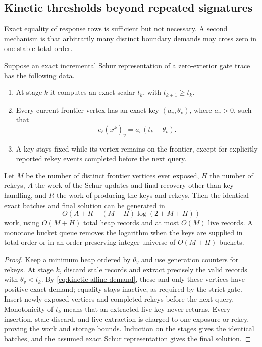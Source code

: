 \subsection{Kinetic thresholds beyond repeated signatures}
\label{sec:kinetic-thresholds}

Exact equality of response rows is sufficient but not necessary.  A second
mechanism is that arbitrarily many distinct boundary demands may cross zero
in one stable total order.

\begin{theorem}
\label{thm:kinetic-scalar-gate}
Suppose an exact incremental Schur representation of a zero-exterior gate
trace has the following data.
\begin{enumerate}[label=(\roman*),leftmargin=*]
 \item At stage $k$ it computes an exact scalar $t_k$, with
 $t_{k+1}\geq t_k$.
 \item Every current frontier vertex has an exact key
 $(a_v,\theta_v)$, where $a_v>0$, such that
 \begin{equation}
  e_\ell(x^k)_v=a_v(t_k-\theta_v).
  \label{eq:kinetic-affine-demand}
 \end{equation}
 \item A key stays fixed while its vertex remains on the frontier, except
 for explicitly reported rekey events completed before the next query.
\end{enumerate}
Let $M$ be the number of distinct frontier vertices ever exposed, $H$ the
number of rekeys, $A$ the work of the Schur updates and final recovery other
than key handling, and $R$ the work of producing the keys and rekeys.  Then
the identical exact batches and final solution can be generated in
\begin{equation}
 O\!\left(A+R+(M+H)\log(2+M+H)\right)
 \label{eq:kinetic-gate-work}
\end{equation}
work, using $O(M+H)$ total heap records and at most $O(M)$ live records.  A
monotone bucket queue removes the
logarithm when the keys are supplied in total order or in an order-preserving
integer universe of $O(M+H)$ buckets.
\end{theorem}

\begin{proof}
Keep a minimum heap ordered by $\theta_v$ and use generation counters for
rekeys.  At stage $k$, discard stale records and extract precisely the valid
records with $\theta_v<t_k$.  By \cref{eq:kinetic-affine-demand}, these and
only these vertices have positive exact demand; equality stays inactive, as
required by the strict gate.  Insert newly exposed vertices and completed
rekeys before the next query.  Monotonicity of $t_k$ means that an extracted
live key never returns.  Every insertion, stale discard, and live extraction
is charged to one exposure or rekey, proving the work and storage bounds.
Induction on the stages gives the identical batches, and the assumed exact
Schur representation gives the final solution.
\end{proof}

